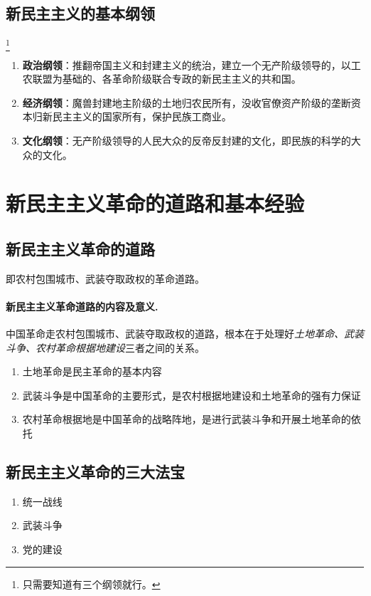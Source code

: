\subsection{新民主主义的基本纲领}\footnote{只需要知道有三个纲领就行。}
\begin{enumerate}
    \item \textbf{政治纲领}：推翻帝国主义和封建主义的统治，建立一个无产阶级领导的，以工农联盟为基础的、各革命阶级联合专政的新民主主义的共和国。
    \item \textbf{经济纲领}：魔兽封建地主阶级的土地归农民所有，没收官僚资产阶级的垄断资本归新民主主义的国家所有，保护民族工商业。
    \item \textbf{文化纲领}：无产阶级领导的人民大众的反帝反封建的文化，即民族的科学的大众的文化。
\end{enumerate}

\section{新民主主义革命的道路和基本经验}

\subsection{新民主主义革命的道路}
即农村包围城市、武装夺取政权的革命道路。

\paragraph{新民主主义革命道路的内容及意义.} 中国革命走农村包围城市、武装夺取政权的道路，根本在于处理好\emph{土地革命、武装斗争、农村革命根据地建设}三者之间的关系。
\begin{enumerate}
    \item 土地革命是民主革命的基本内容
    \item 武装斗争是中国革命的主要形式，是农村根据地建设和土地革命的强有力保证
    \item 农村革命根据地是中国革命的战略阵地，是进行武装斗争和开展土地革命的依托
\end{enumerate}

\subsection{新民主主义革命的三大法宝}
\begin{enumerate}
    \item 统一战线
    \item 武装斗争
    \item 党的建设
\end{enumerate}